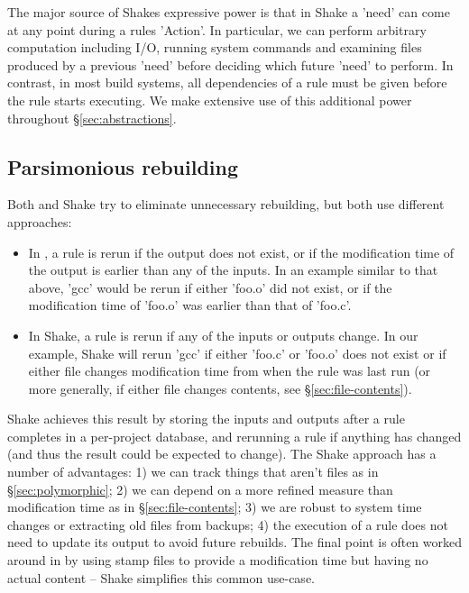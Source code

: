 The major source of Shakes expressive power is that in Shake a \lst'need' can come at any point during a rules \lst'Action'. In particular, we can perform arbitrary computation including I/O, running system commands and examining files produced by a previous \lst'need' before deciding which future \lst'need' to perform. In contrast, in most build systems, all dependencies of a rule must be given before the rule starts executing. We make extensive use of this additional power throughout \S\ref{sec:abstractions}.

\subsection{Parsimonious rebuilding}

Both \make{} and Shake try to eliminate unnecessary rebuilding, but both use different approaches:

\begin{itemize}
\item In \make{}, a rule is rerun if the output does not exist, or if the modification time of the output is earlier than any of the inputs. In an example similar to that above, \lst'gcc' would be rerun if either \lst'foo.o' did not exist, or if the modification time of \lst'foo.o' was earlier than that of \lst'foo.c'.
\item In Shake, a rule is rerun if any of the inputs or outputs change. In our example, Shake will rerun \lst'gcc' if either \lst'foo.c' or \lst'foo.o' does not exist or if either file changes modification time from when the rule was last run (or more generally, if either file changes contents, see \S\ref{sec:file-contents}).
\end{itemize}

Shake achieves this result by storing the inputs and outputs after a rule completes in a per-project database, and rerunning a rule if anything has changed (and thus the result could be expected to change). The Shake approach has a number of advantages: 1) we can track things that aren't files as in \S\ref{sec:polymorphic}; 2) we can depend on a more refined measure than modification time as in \S\ref{sec:file-contents}; 3) we are robust to system time changes or extracting old files from backups; 4) the execution of a rule does not need to update its output to avoid future rebuilds. The final point is often worked around in \make{} by using stamp files to provide a modification time but having no actual content -- Shake simplifies this common use-case.

